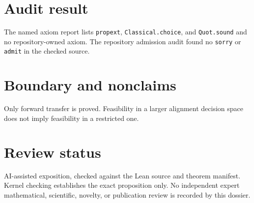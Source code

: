 \documentclass[11pt]{article}
\begin{document}
\section{Audit result}
The named axiom report lists \texttt{propext}, \texttt{Classical.choice}, and
\texttt{Quot.sound} and no repository-owned axiom.  The repository admission audit found no
\texttt{sorry} or \texttt{admit} in the checked source.

\section{Boundary and nonclaims}
Only forward transfer is proved.  Feasibility in a larger alignment decision space does not imply feasibility in a restricted one.

\section{Review status}
AI-assisted exposition, checked against the Lean source and theorem manifest.  Kernel checking
establishes the exact proposition only.  No independent expert mathematical, scientific,
novelty, or publication review is recorded by this dossier.
\end{document}
